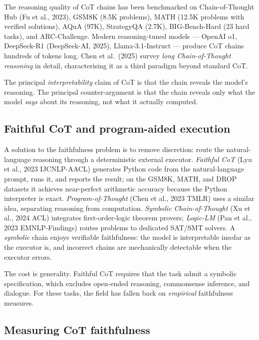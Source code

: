 The reasoning quality of CoT chains has been benchmarked on Chain-of-Thought Hub (Fu et al., 2023), GSM8K (8.5K problems), MATH (12.5K problems with verified solutions), AQuA (97K), StrategyQA (2.7K), BIG-Bench-Hard (23 hard tasks), and ARC-Challenge. Modern reasoning-tuned models --- OpenAI o1, DeepSeek-R1 (DeepSeek-AI, 2025), Llama-3.1-Instruct --- produce CoT chains hundreds of tokens long. Chen et al.~(2025) survey \emph{long Chain-of-Thought reasoning} in detail, characterising it as a third paradigm beyond standard CoT.

The principal \emph{interpretability} claim of CoT is that the chain reveals the model's reasoning. The principal counter-argument is that the chain reveals only what the model \emph{says} about its reasoning, not what it actually computed.

\subsection{Faithful CoT and program-aided execution}\label{faithful-cot-and-program-aided-execution}

A solution to the faithfulness problem is to remove discretion: route the natural-language reasoning through a deterministic external executor. \emph{Faithful CoT} (Lyu et al., 2023 IJCNLP-AACL) generates Python code from the natural-language prompt, runs it, and reports the result; on the GSM8K, MATH, and DROP datasets it achieves near-perfect arithmetic accuracy because the Python interpreter is exact. \emph{Program-of-Thought} (Chen et al., 2023 TMLR) uses a similar idea, separating reasoning from computation. \emph{Symbolic Chain-of-Thought} (Xu et al., 2024 ACL) integrates first-order-logic theorem provers; \emph{Logic-LM} (Pan et al., 2023 EMNLP-Findings) routes problems to dedicated SAT/SMT solvers. A \emph{symbolic} chain enjoys verifiable faithfulness: the model is interpretable insofar as the executor is, and incorrect chains are mechanically detectable when the executor errors.

The cost is generality. Faithful CoT requires that the task admit a symbolic specification, which excludes open-ended reasoning, commonsense inference, and dialogue. For these tasks, the field has fallen back on \emph{empirical} faithfulness measures.

\subsection{Measuring CoT faithfulness}\label{measuring-cot-faithfulness}

